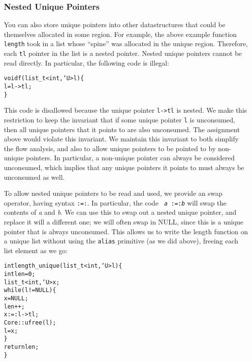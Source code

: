 
\subsubsection{Nested Unique Pointers}

You can also store unique pointers into other datastructures that could be
themselves allocated in some region.  For example, the above example
function \texttt{length} took in a list whose ``spine'' was allocated in the
unique region.  Therefore, each \texttt{tl} pointer in the list is a nested
pointer.  Nested unique pointers cannot be read directly.  In particular,
the following code is illegal:
\begin{alltt}
  void f(list\_t<int,`U> l) \{
    l = l->tl;
  \}
\end{alltt}
This code is disallowed because the unique pointer \texttt{l->tl} is nested.
We make this restriction to keep the invariant that if some unique pointer
\texttt{l} is unconsumed, then all unique pointers that it points to are
also unconsumed.  The assignment above would violate this invariant.  We
maintain this invariant to both simplify the flow analysis, and also to
allow unique pointers to be pointed to by non-unique pointers.  In
particular, a non-unique pointer can always be considered unconsumed, which
implies that any unique pointers it points to must always be unconsumed as
well.

To allow nested unique pointers to be read and used, we provide an swap
operator, having syntax \texttt{:=:}.  In particular, the code \texttt{{\it
a} :=:{\it b}} will swap the contents of {\it a} and {\it b}.  We can use
this to swap out a nested unique pointer, and replace it will a different
one; we will often swap in NULL, since this is a unique pointer that is
always unconsumed.  This allows us to write the length function on a unique
list without using the \texttt{alias} primitive (as we did above), freeing
each list element as we go:
\begin{alltt}
  int length\_unique(list\_t<int,`U> l) \{
    int len = 0;
    list\_t<int,`U> x;
    while (l != NULL) \{
      x = NULL;
      len++;
      x :=: l->tl;
      Core::ufree(l);
      l = x;
    \}
    return len;
  \}
\end{alltt}


